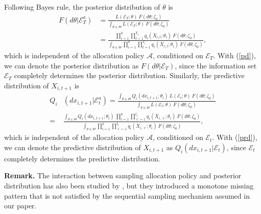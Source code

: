 \documentclass[journal]{IEEEtran}
\begin{document}
\begin{IEEEproof}
  Following Bayes rule, the posterior distribution of $\theta$ is
 \begin{equation}\label{pd}
 \begin{aligned} F(d\theta|\mathcal{E}_T^a)
 &=\frac{ L(\mathcal{E}_T;\theta) ~F(d\theta;\zeta_0)}{\int_{\theta\in\Theta} L(\mathcal{E}_T;\theta) ~F(d\theta;\zeta_0) }
 \\&= \frac{\prod_{i=1}^{k}\prod_{t=1}^{T_i} q_i(\bar{X}_{i,t};\theta_i)~ F\left(d\theta;\zeta_0\right)}{\int_{\theta\in\Theta} \prod_{i=1}^{k}\prod_{t=1}^{T_i} q_i(\bar{X}_{i,t};\theta_i)~ F\left(d\theta;\zeta_{0}\right)},\end{aligned}
 \end{equation}
 which is independent of the allocation policy $\mathcal{A}$, conditioned on $\mathcal{E}_T$. With (\ref{pd}), we can denote the posterior distribution as $F(d\theta|\mathcal{E}_T)$, since the information set $\mathcal{E}_T$ completely determines the posterior distribution. 
 Similarly, the predictive distribution of $X_{i,t+1}$ is 
  \begin{equation}\label{prd}
  \begin{aligned}Q_i&(dx_{i,t+1}|\mathcal{E}_{t}^a)
  =\frac{\int_{\theta\in\Theta}Q_i(dx_{i,t+1};\theta_i)~L(\mathcal{E}_t;\theta)~F(d\theta;\zeta_0)}{\int_{\theta\in\Theta} L(\mathcal{E}_t;\theta)~F(d\theta;\zeta_0)} \\
  =&\frac{\int_{\theta\in\Theta}Q_i(dx_{i,t+1};\theta_i)~\prod_{i=1}^{k}\prod_{\ell=1}^{t_i} q_i(\bar{X}_{i,\ell};\theta_i)~ F\left(d\theta;\zeta_0\right)}{\int_{\theta\in\Theta}  \prod_{i=1}^{k}\prod_{\ell=1}^{t_i} q_i(\bar{X}_{i,\ell};\theta_i)~ F\left(d\theta;\zeta_0\right)},\end{aligned}
  \end{equation}
 which is independent of the allocation policy $\mathcal{A}$, conditioned on $\mathcal{E}_t$. With (\ref{prd}), we can denote the  predictive distribution of $X_{i,t+1}$ as $Q_i(dx_{i,t+1}|\mathcal{E}_{t})$, since  $\mathcal{E}_t$ completely determines the predictive distribution.
\end{IEEEproof}
 \noindent\textbf{Remark.} 
 The interaction between sampling allocation policy and posterior distribution has also been studied by  \cite{gorder2014ranking}, but they introduced a monotone missing pattern that is not satisfied by the sequential sampling mechanism assumed in our paper. 
\end{document}
